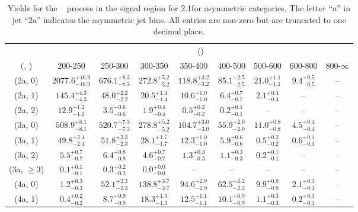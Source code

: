 \begin{table}[h!]
\tiny
\centering
\caption{Yields for the \zInv~ process in the signal region for 2.1\ifb for asymmetric categories. The letter ``a'' in jet \eg ``2a''  indicates the asymmetric jet bins. All entries are non-zero but are truncated to one decimal place.\label{tab:yieldssep_sig_zinv_asym}}
\begin{tabular}
{ccccccccc}
	\hline\hline
	& \multicolumn{8}{c}{\scalht (\gev)} \\ 
	 (\njet,  \nb) & 200-250 & 250-300 & 300-350 & 350-400 & 400-500 & 500-600 & 600-800 & 800-$\infty$ \\ [0.8ex] 
\hline
	(2a, 0) & $2077.6^{+ 16.9 }_{- 16.9 }$ & $676.1^{+ 8.3 }_{- 8.3 }$ & $272.8^{+ 5.2 }_{- 5.2 }$ & $118.8^{+ 3.2 }_{- 3.2 }$ & $85.1^{+ 2.5 }_{- 2.5 }$ & $21.0^{+ 1.1 }_{- 1.1 }$ & $9.4^{+ 0.5 }_{- 0.5 }$ & -- \\[0.5ex] 
	(2a, 1) & $145.4^{+ 4.3 }_{- 4.3 }$ & $48.0^{+ 2.2 }_{- 2.2 }$ & $20.5^{+ 1.4 }_{- 1.4 }$ & $10.6^{+ 1.0 }_{- 1.0 }$ & $6.4^{+ 0.7 }_{- 0.7 }$ & $2.1^{+ 0.4 }_{- 0.4 }$ & -- & -- \\[0.5ex] 
	(2a, 2) & $12.9^{+ 1.2 }_{- 1.2 }$ & $3.5^{+ 0.6 }_{- 0.6 }$ & $1.9^{+ 0.4 }_{- 0.4 }$ & $0.5^{+ 0.2 }_{- 0.2 }$ & $0.2^{+ 0.1 }_{- 0.1 }$ & -- & -- & -- \\[0.5ex] 
	(3a, 0) & $508.9^{+ 8.1 }_{- 8.1 }$ & $520.7^{+ 7.3 }_{- 7.3 }$ & $278.8^{+ 5.2 }_{- 5.2 }$ & $104.7^{+ 3.0 }_{- 3.0 }$ & $55.9^{+ 2.0 }_{- 2.0 }$ & $11.0^{+ 0.8 }_{- 0.8 }$ & $4.5^{+ 0.4 }_{- 0.4 }$ & -- \\[0.5ex] 
	(3a, 1) & $49.8^{+ 2.4 }_{- 2.4 }$ & $51.8^{+ 2.3 }_{- 2.3 }$ & $28.1^{+ 1.7 }_{- 1.7 }$ & $12.3^{+ 1.0 }_{- 1.0 }$ & $5.9^{+ 0.6 }_{- 0.6 }$ & $0.5^{+ 0.2 }_{- 0.2 }$ & $0.6^{+ 0.1 }_{- 0.1 }$ & -- \\[0.5ex] 
	(3a, 2) & $5.5^{+ 0.7 }_{- 0.7 }$ & $6.4^{+ 0.8 }_{- 0.8 }$ & $4.6^{+ 0.7 }_{- 0.7 }$ & $1.3^{+ 0.3 }_{- 0.3 }$ & $1.1^{+ 0.3 }_{- 0.3 }$ & $0.2^{+ 0.1 }_{- 0.1 }$ & -- & -- \\[0.5ex] 
	(3a, $\ge3$) & $0.1^{+ 0.1 }_{- 0.1 }$ & $0.3^{+ 0.2 }_{- 0.2 }$ & $0.0^{+ 0.0 }_{- 0.0 }$ & -- & -- & -- & -- & -- \\[0.5ex] 
	(4a, 0) & $1.2^{+ 0.3 }_{- 0.3 }$ & $52.1^{+ 2.3 }_{- 2.3 }$ & $138.8^{+ 3.7 }_{- 3.7 }$ & $94.6^{+ 2.9 }_{- 2.9 }$ & $62.5^{+ 2.2 }_{- 2.2 }$ & $9.9^{+ 0.8 }_{- 0.8 }$ & $2.1^{+ 0.3 }_{- 0.3 }$ & -- \\[0.5ex] 
	(4a, 1) & $0.4^{+ 0.2 }_{- 0.2 }$ & $8.7^{+ 0.9 }_{- 0.9 }$ & $18.3^{+ 1.3 }_{- 1.3 }$ & $12.5^{+ 1.1 }_{- 1.1 }$ & $10.1^{+ 0.9 }_{- 0.9 }$ & $1.1^{+ 0.3 }_{- 0.3 }$ & $0.2^{+ 0.1 }_{- 0.1 }$ & -- \\[0.5ex] 

\end{tabular}
\end{table}
